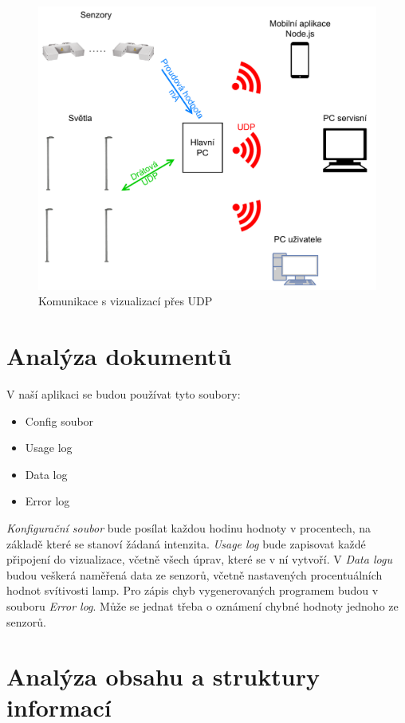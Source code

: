 \begin{figure}[H]
    \centering\includegraphics[width=.8\textwidth]{Figures/udp.drawio.pdf}   
    \caption{Komunikace s vizualizací přes UDP}
    \label{Obr-Komunikace}
\end{figure}

\section{Analýza dokumentů}

V naší aplikaci se budou používat tyto soubory:
\begin{itemize}
    \item Config soubor
    \item Usage log
    \item Data log
    \item Error log
\end{itemize}

\textit{Konfigurační soubor} bude posílat každou hodinu hodnoty v procentech, na základě které se stanoví žádaná intenzita. \textit{Usage log} bude zapisovat každé připojení do vizualizace, včetně všech úprav, které se v ní vytvoří. V \textit{Data logu} budou veškerá naměřená data ze senzorů, včetně nastavených procentuálních hodnot svítivosti lamp. Pro zápis chyb vygenerovaných programem budou v souboru \textit{Error log}. Může se jednat třeba o oznámení chybné hodnoty jednoho ze senzorů.

\section{Analýza obsahu a struktury informací}

